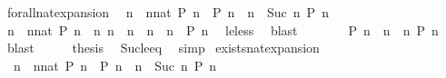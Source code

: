 \begin{isabellebody}
%
\endisatagproof
{\isafoldproof}%
%
\isadelimproof
\isanewline
%
\endisadelimproof
\isanewline
{}\isamarkupfalse%
\ forall{\isacharunderscore}nat{\isacharunderscore}expansion{\isacharcolon}\isanewline
\ \ {\isacartoucheopen}{\isacharparenleft}{\isasymforall}n\ {\isasymge}\ {\isacharparenleft}nnat{\isacharparenright}{\isachardot}\ P\ n{\isacharparenright}\ {\isacharequal}\ {\isacharparenleft}P\ n\ {\isasymand}\ {\isacharparenleft}{\isasymforall}n\ {\isasymge}\ Suc\ n\ P\ n{\isacharparenright}{\isacharparenright}{\isacartoucheclose}\isanewline
%
\isadelimproof
%
\endisadelimproof
%
\isatagproof
{}\isamarkupfalse%
\ {\isacharminus}\isanewline
\ \ \isamarkupfalse%
\ {\isacartoucheopen}{\isacharparenleft}{\isasymforall}n\ {\isasymge}\ {\isacharparenleft}nnat{\isacharparenright}{\isachardot}\ P\ n{\isacharparenright}\ {\isacharequal}\ {\isacharparenleft}{\isasymforall}n{\isachardot}\ {\isacharparenleft}n\ {\isacharequal}\ n\ {\isasymor}\ n\ {\isachargreater}\ n\ {\isasymlongrightarrow}\ P\ n{\isacharparenright}{\isacartoucheclose}\ \isamarkupfalse%
\ le{\isacharunderscore}less\ \isamarkupfalse%
\ blast\isanewline
\ \ \isamarkupfalse%
\ \isamarkupfalse%
\ {\isacartoucheopen}{\isachardot}{\isachardot}{\isachardot}\ {\isacharequal}\ {\isacharparenleft}P\ n\ {\isasymand}\ {\isacharparenleft}{\isasymforall}n\ {\isachargreater}\ n\ P\ n{\isacharparenright}{\isacharparenright}{\isacartoucheclose}\ \isamarkupfalse%
\ blast\isanewline
\ \ \isamarkupfalse%
\ \isamarkupfalse%
\ {\isacharquery}thesis\ \isamarkupfalse%
\ Suc{\isacharunderscore}le{\isacharunderscore}eq\ \isamarkupfalse%
\ simp\isanewline
{}\isamarkupfalse%
%
\endisatagproof
{\isafoldproof}%
%
\isadelimproof
\isanewline
%
\endisadelimproof
\isanewline
{}\isamarkupfalse%
\ exists{\isacharunderscore}nat{\isacharunderscore}expansion{\isacharcolon}\isanewline
\ \ {\isacartoucheopen}{\isacharparenleft}{\isasymexists}n\ {\isasymge}\ {\isacharparenleft}nnat{\isacharparenright}{\isachardot}\ P\ n{\isacharparenright}\ {\isacharequal}\ {\isacharparenleft}P\ n\ {\isasymor}\ {\isacharparenleft}{\isasymexists}n\ {\isasymge}\ Suc\ n\ P\ n{\isacharparenright}{\isacharparenright}{\isacartoucheclose}\isanewline

\end{isabellebody}
